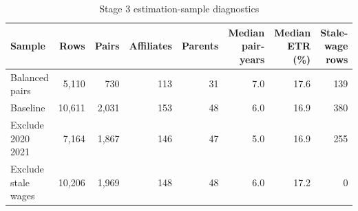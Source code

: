 \begin{table}[H]
\centering
\footnotesize
\setlength{\tabcolsep}{3pt}
\caption{Stage 3 estimation-sample diagnostics}
\label{tab:app_stage3_sample_summary}
\begin{tabular}{@{}lrrrrrrr@{}}
\toprule
Sample & Rows & Pairs & Affiliates & Parents & Median pair-years & Median ETR (\%) & Stale-wage rows \\
\midrule
Balanced pairs &  5,110 &   730 & 113 & 31 & 7.0 & 17.6 & 139 \\
Baseline & 10,611 & 2,031 & 153 & 48 & 6.0 & 16.9 & 380 \\
Exclude 2020 2021 &  7,164 & 1,867 & 146 & 47 & 5.0 & 16.9 & 255 \\
Exclude stale wages & 10,206 & 1,969 & 148 & 48 & 6.0 & 17.2 &   0 \\
\bottomrule
\end{tabular}
\end{table}
